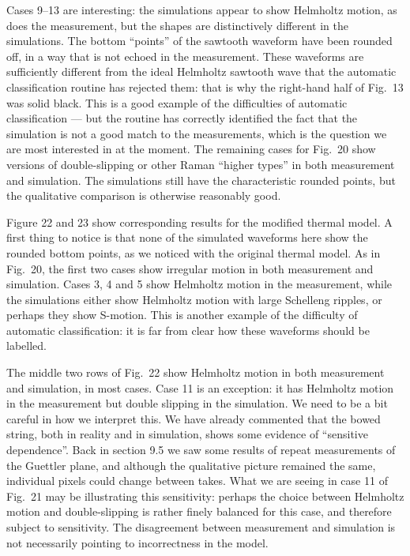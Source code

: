   Cases 9--13 are interesting: the simulations appear to show Helmholtz motion, 
  as does the measurement, but the shapes are distinctively different in the 
  simulations. The bottom “points” of the sawtooth waveform have been rounded 
  off, in a way that is not echoed in the measurement. These waveforms are 
  sufficiently different from the ideal Helmholtz sawtooth wave that the 
  automatic classification routine has rejected them: that is why the 
  right-hand half of Fig.\ 13 was solid black. This is a good example of the 
  difficulties of automatic classification --- but the routine has correctly 
  identified the fact that the simulation is not a good match to the 
  measurements, which is the question we are most interested in at the moment. 
  The remaining cases for Fig.\ 20 show versions of double-slipping or other 
  Raman “higher types” in both measurement and simulation. The simulations 
  still have the characteristic rounded points, but the qualitative comparison 
  is otherwise reasonably good. 

  Figure 22 and 23 show corresponding results for the modified thermal model. A 
  first thing to notice is that none of the simulated waveforms here show the 
  rounded bottom points, as we noticed with the original thermal model. As in 
  Fig.\ 20, the first two cases show irregular motion in both measurement and 
  simulation. Cases 3, 4 and 5 show Helmholtz motion in the measurement, while 
  the simulations either show Helmholtz motion with large Schelleng ripples, or 
  perhaps they show S-motion. This is another example of the difficulty of 
  automatic classification: it is far from clear how these waveforms should be 
  labelled. 

  The middle two rows of Fig.\ 22 show Helmholtz motion in both measurement and 
  simulation, in most cases. Case 11 is an exception: it has Helmholtz motion 
  in the measurement but double slipping in the simulation. We need to be a bit 
  careful in how we interpret this. We have already commented that the bowed 
  string, both in reality and in simulation, shows some evidence of “sensitive 
  dependence”. Back in section 9.5 we saw some results of repeat measurements 
  of the Guettler plane, and although the qualitative picture remained the 
  same, individual pixels could change between takes. What we are seeing in 
  case 11 of Fig.\ 21 may be illustrating this sensitivity: perhaps the choice 
  between Helmholtz motion and double-slipping is rather finely balanced for 
  this case, and therefore subject to sensitivity. The disagreement between 
  measurement and simulation is not necessarily pointing to incorrectness in 
  the model. 

